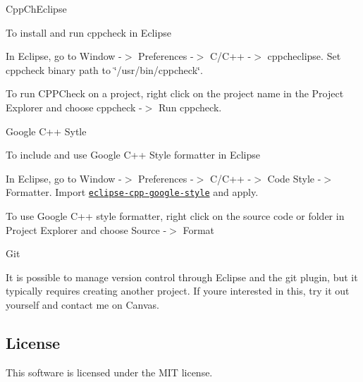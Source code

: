 \begin{DoxyItemize}
\item Cpp\+Ch\+Eclipse

To install and run cppcheck in Eclipse
\begin{DoxyEnumerate}
\item In Eclipse, go to Window -\/$>$ Preferences -\/$>$ C/\+C++ -\/$>$ cppcheclipse. Set cppcheck binary path to \char`\"{}/usr/bin/cppcheck\char`\"{}.
\item To run C\+P\+P\+Check on a project, right click on the project name in the Project Explorer and choose cppcheck -\/$>$ Run cppcheck.
\end{DoxyEnumerate}
\item Google C++ Sytle

To include and use Google C++ Style formatter in Eclipse
\begin{DoxyEnumerate}
\item In Eclipse, go to Window -\/$>$ Preferences -\/$>$ C/\+C++ -\/$>$ Code Style -\/$>$ Formatter. Import \href{https://raw.githubusercontent.com/google/styleguide/gh-pages/eclipse-cpp-google-style.xml}{\tt eclipse-\/cpp-\/google-\/style} and apply.
\item To use Google C++ style formatter, right click on the source code or folder in Project Explorer and choose Source -\/$>$ Format
\end{DoxyEnumerate}
\item Git

It is possible to manage version control through Eclipse and the git plugin, but it typically requires creating another project. If you\textquotesingle{}re interested in this, try it out yourself and contact me on Canvas.
\end{DoxyItemize}

\subsection*{License}

This software is licensed under the M\+IT license. 